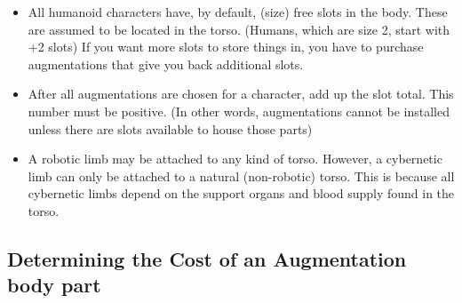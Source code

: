 \begin{itemize}
\item All humanoid characters have, by default, (size) free slots in the body.
These are assumed to be located in the torso.  (Humans, which are size 2, 
start with +2 slots) If you want more slots to store things in, you have to 
purchase augmentations that give you back additional slots.
\item After all augmentations are chosen for a character, add up the slot 
total.  This number must be positive.  (In other words, augmentations cannot 
be installed unless there are slots available to house those parts)
\item A robotic limb may be attached to any kind of torso.  However, a 
cybernetic limb can only be attached to a natural (non-robotic) torso.  
This is because all cybernetic limbs depend on the support organs and 
blood supply found in the torso.
\end{itemize}

\subsection{Determining the Cost of an Augmentation body part}